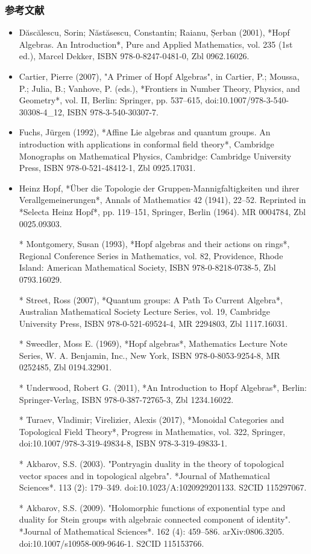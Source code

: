 \subsubsection{参考文献}
\begin{itemize}
\item Dăscălescu, Sorin; Năstăsescu, Constantin; Raianu, Șerban (2001), *Hopf Algebras. An Introduction*, Pure and Applied Mathematics, vol. 235 (1st ed.), Marcel Dekker, ISBN 978-0-8247-0481-0, Zbl 0962.16026.

\item Cartier, Pierre (2007), "A Primer of Hopf Algebras", in Cartier, P.; Moussa, P.; Julia, B.; Vanhove, P. (eds.), *Frontiers in Number Theory, Physics, and Geometry*, vol. II, Berlin: Springer, pp. 537–615, doi:10.1007/978-3-540-30308-4\_12, ISBN 978-3-540-30307-7.

\item Fuchs, Jürgen (1992), *Affine Lie algebras and quantum groups. An introduction with applications in conformal field theory*, Cambridge Monographs on Mathematical Physics, Cambridge: Cambridge University Press, ISBN 978-0-521-48412-1, Zbl 0925.17031.

\item Heinz Hopf, *Über die Topologie der Gruppen-Mannigfaltigkeiten und ihrer Verallgemeinerungen*, Annals of Mathematics 42 (1941), 22–52. Reprinted in *Selecta Heinz Hopf*, pp. 119–151, Springer, Berlin (1964). MR 0004784, Zbl 0025.09303.

* Montgomery, Susan (1993), *Hopf algebras and their actions on rings*, Regional Conference Series in Mathematics, vol. 82, Providence, Rhode Island: American Mathematical Society, ISBN 978-0-8218-0738-5, Zbl 0793.16029.

* Street, Ross (2007), *Quantum groups: A Path To Current Algebra*, Australian Mathematical Society Lecture Series, vol. 19, Cambridge University Press, ISBN 978-0-521-69524-4, MR 2294803, Zbl 1117.16031.

* Sweedler, Moss E. (1969), *Hopf algebras*, Mathematics Lecture Note Series, W. A. Benjamin, Inc., New York, ISBN 978-0-8053-9254-8, MR 0252485, Zbl 0194.32901.

* Underwood, Robert G. (2011), *An Introduction to Hopf Algebras*, Berlin: Springer-Verlag, ISBN 978-0-387-72765-3, Zbl 1234.16022.

* Turaev, Vladimir; Virelizier, Alexis (2017), *Monoidal Categories and Topological Field Theory*, Progress in Mathematics, vol. 322, Springer, doi:10.1007/978-3-319-49834-8, ISBN 978-3-319-49833-1.

* Akbarov, S.S. (2003). "Pontryagin duality in the theory of topological vector spaces and in topological algebra". *Journal of Mathematical Sciences*. 113 (2): 179–349. doi:10.1023/A:1020929201133. S2CID 115297067.

* Akbarov, S.S. (2009). "Holomorphic functions of exponential type and duality for Stein groups with algebraic connected component of identity". *Journal of Mathematical Sciences*. 162 (4): 459–586. arXiv:0806.3205. doi:10.1007/s10958-009-9646-1. S2CID 115153766.
\end{itemize}

